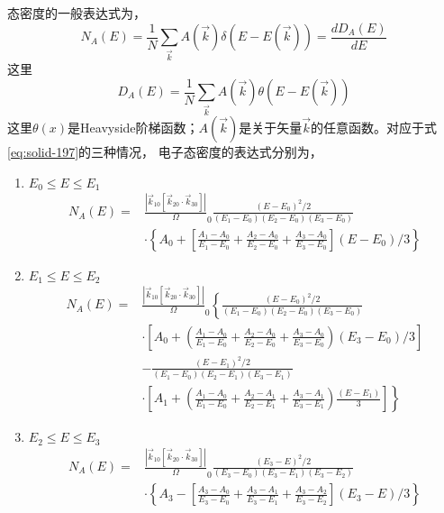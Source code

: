 态密度的一般表达式为，
\begin{equation}
  N_A(E)=\frac1N\sum_{\vec k}A(\vec k)\delta(E-E(\vec k))=\frac{dD_A(E)}{dE}
  \label{eq:solid-198}
\end{equation}
这里
\begin{equation}
  D_A(E)=\frac1N\sum_{\vec k}A(\vec k)\theta(E-E(\vec k))
  \label{eq:solid-199}
\end{equation}
这里$\theta(x)$是Heavyside阶梯函数；$A(\vec k)$是关于矢量$\vec k$的任意函数。对应于式\eqref{eq:solid-197}的三种情况，
电子态密度的表达式分别为，
\begin{enumerate}
\item $E_0\leqslant E\leqslant E_1$
\begin{equation}
  \begin{split}
    N_A(E)=&\frac{|\vec k_{10}[\vec k_{20}\cdot\vec k_{30}]|}\Omega_0\frac{(E-E_0)^2/2}{(E_1-E_0)(E_2-E_0)(E_3-E_0)}\\
    &\cdot\left\{A_0+\left[\frac{A_1-A_0}{E_1-E_0}+\frac{A_2-A_0}{E_2-E_0}+\frac{A_3-A_0}{E_3-E_0}\right](E-E_0)/3\right\}
  \end{split}
  \label{eq:solid-200}
\end{equation}
\item $E_1\leqslant E\leqslant E_2$
\begin{equation}
  \begin{split}
    N_A(E)=&\frac{|\vec k_{10}[\vec k_{20}\cdot\vec k_{30}]|}\Omega_0\left\{\frac{(E-E_0)^2/2}{(E_1-E_0)(E_2-E_0)(E_3-E_0)}\right.\\
    &\cdot\left[A_0+\left(\frac{A_1-A_0}{E_1-E_0}+\frac{A_2-A_0}{E_2-E_0}+\frac{A_3-A_0}{E_3-E_0}\right)(E_3-E_0)/3\right]\\
    &-\frac{(E-E_1)^2/2}{(E_1-E_0)(E_2-E_1)(E_3-E_1)}\\
    &\cdot\left.\left[A_1+\left(\frac{A_1-A_0}{E_1-E_0}+\frac{A_2-A_1}{E_2-E_1}+\frac{A_3-A_1}{E_3-E_1}\right)\frac{(E-E_1)}3\right]\right\}
  \end{split}
  \label{eq:solid-201}
\end{equation}
\item $E_2\leqslant E\leqslant E_3$
\begin{equation}
  \begin{split}
    N_A(E)=&\frac{|\vec k_{10}[\vec k_{20}\cdot\vec k_{30}]|}\Omega_0\frac{(E_3-E)^2/2}{(E_3-E_0)(E_3-E_1)(E_3-E_2)}\\
    &\cdot\left\{A_3-\left[\frac{A_3-A_0}{E_3-E_0}+\frac{A_3-A_1}{E_3-E_1}+\frac{A_3-A_2}{E_3-E_2}\right](E_3-E)/3\right\}
  \end{split}
  \label{eq:solid-202}
\end{equation}
\end{enumerate}

